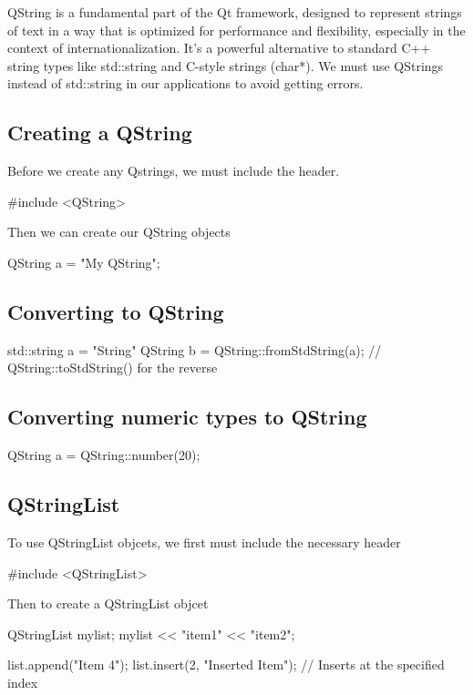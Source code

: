 \documentclass{report}
\begin{document}
    \pagebreak 
    \bigbreak \noindent 
    QString is a fundamental part of the Qt framework, designed to represent strings of text in a way that is optimized for performance and flexibility, especially in the context of internationalization. It's a powerful alternative to standard C++ string types like std::string and C-style strings (char*).
    \bigbreak \noindent 
    We must use QStrings instead of std::string in our applications to avoid getting errors.
    \bigbreak \noindent 
    \subsection{Creating a QString}
    \bigbreak \noindent 
    Before we create any Qstrings, we must include the header.
    \bigbreak \noindent 
    \begin{cppcode}
#include <QString>
    \end{cppcode}
    \bigbreak \noindent 
    Then we can create our QString objects
    \bigbreak \noindent 
    \begin{cppcode}
    QString a = "My QString";
    \end{cppcode}
    \bigbreak \noindent 
    \subsection{Converting to QString}
    \bigbreak \noindent 
    \begin{cppcode}
std::string a = "String"
QString b = QString::fromStdString(a); // QString::toStdString() for the reverse
    \end{cppcode}

    \pagebreak
    \subsection{Converting numeric types to QString}
    \bigbreak \noindent 
    \begin{cppcode}
    QString a = QString::number(20);
    \end{cppcode}

    \bigbreak \noindent 
    \subsection{QStringList}
    \bigbreak \noindent 
    To use QStringList objcets, we first must include the necessary header
    \bigbreak \noindent 
    \begin{cppcode}
    #include <QStringList>
    \end{cppcode}
    \bigbreak \noindent 
    Then to create a QStringList objcet
    \bigbreak \noindent 
    \begin{cppcode}
    QStringList mylist;
    mylist << "item1" << "item2";

    list.append("Item 4");
    list.insert(2, "Inserted Item");  // Inserts at the specified index
    \end{cppcode}
    \bigbreak \noindent 
\end{document}
